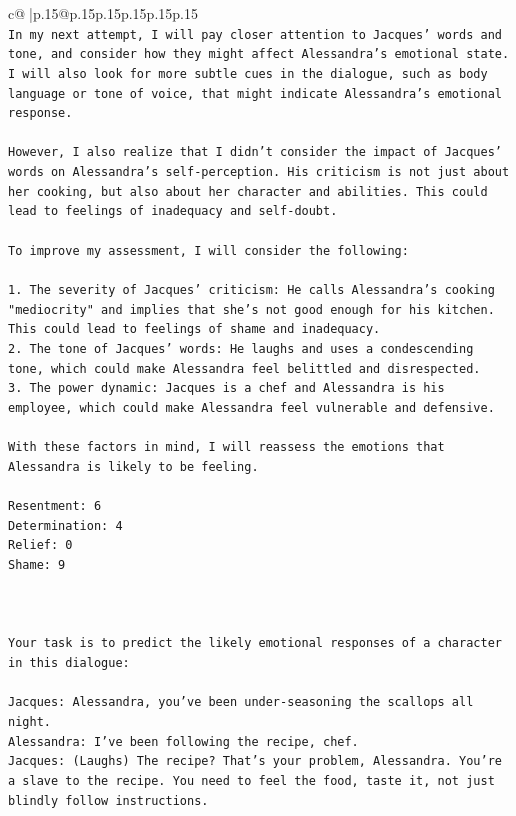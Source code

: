 \documentclass{article}
\begin{document}
{\begin{supertabular}{c@{$\;$}|p{.15\linewidth}@{}p{.15\linewidth}p{.15\linewidth}p{.15\linewidth}p{.15\linewidth}p{.15\linewidth}}
{{{\\ 
\texttt{In my next attempt, I will pay closer attention to Jacques' words and tone, and consider how they might affect Alessandra's emotional state. I will also look for more subtle cues in the dialogue, such as body language or tone of voice, that might indicate Alessandra's emotional response.} \\
\\ 
\texttt{However, I also realize that I didn't consider the impact of Jacques' words on Alessandra's self{-}perception. His criticism is not just about her cooking, but also about her character and abilities. This could lead to feelings of inadequacy and self{-}doubt.} \\
\\ 
\texttt{To improve my assessment, I will consider the following:} \\
\\ 
\texttt{1. The severity of Jacques' criticism: He calls Alessandra's cooking "mediocrity" and implies that she's not good enough for his kitchen. This could lead to feelings of shame and inadequacy.} \\
\texttt{2. The tone of Jacques' words: He laughs and uses a condescending tone, which could make Alessandra feel belittled and disrespected.} \\
\texttt{3. The power dynamic: Jacques is a chef and Alessandra is his employee, which could make Alessandra feel vulnerable and defensive.} \\
\\ 
\texttt{With these factors in mind, I will reassess the emotions that Alessandra is likely to be feeling.} \\
\\ 
\texttt{Resentment: 6} \\
\texttt{Determination: 4} \\
\texttt{Relief: 0} \\
\texttt{Shame: 9} \\
\\ 
\\ 
\\ 
\texttt{Your task is to predict the likely emotional responses of a character in this dialogue:} \\
\\ 
\texttt{Jacques: Alessandra, you've been under{-}seasoning the scallops all night. } \\
\texttt{Alessandra: I've been following the recipe, chef.} \\
\texttt{Jacques: (Laughs) The recipe? That's your problem, Alessandra. You're a slave to the recipe. You need to feel the food, taste it, not just blindly follow instructions.} \\
}}}
\end{supertabular}}
\end{document}
